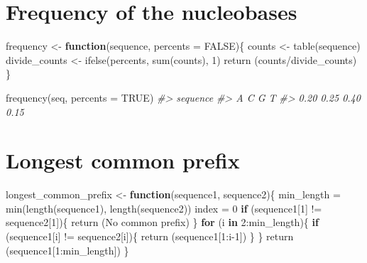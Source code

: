 \documentclass[
]{book}
\newenvironment{Shaded}{\begin{snugshade}}{\end{snugshade}}
\newcommand{\AttributeTok}[1]{\textcolor[rgb]{0.77,0.63,0.00}{#1}}
\newcommand{\CommentTok}[1]{\textcolor[rgb]{0.56,0.35,0.01}{\textit{#1}}}
\newcommand{\ConstantTok}[1]{\textcolor[rgb]{0.00,0.00,0.00}{#1}}
\newcommand{\ControlFlowTok}[1]{\textcolor[rgb]{0.13,0.29,0.53}{\textbf{#1}}}
\newcommand{\DecValTok}[1]{\textcolor[rgb]{0.00,0.00,0.81}{#1}}
\newcommand{\FunctionTok}[1]{\textcolor[rgb]{0.00,0.00,0.00}{#1}}
\newcommand{\NormalTok}[1]{#1}
\newcommand{\OtherTok}[1]{\textcolor[rgb]{0.56,0.35,0.01}{#1}}
\newcommand{\SpecialCharTok}[1]{\textcolor[rgb]{0.00,0.00,0.00}{#1}}
\newcommand{\StringTok}[1]{\textcolor[rgb]{0.31,0.60,0.02}{#1}}
\begin{document}
\hypertarget{frequency-of-the-nucleobases}{%
\section{Frequency of the nucleobases}\label{frequency-of-the-nucleobases}}

\begin{Shaded}
\begin{Highlighting}[]
\NormalTok{frequency }\OtherTok{\textless{}{-}} \ControlFlowTok{function}\NormalTok{(sequence, }\AttributeTok{percents =} \ConstantTok{FALSE}\NormalTok{)\{}
\NormalTok{  counts }\OtherTok{\textless{}{-}} \FunctionTok{table}\NormalTok{(sequence)}
\NormalTok{  divide\_counts }\OtherTok{\textless{}{-}} \FunctionTok{ifelse}\NormalTok{(percents, }\FunctionTok{sum}\NormalTok{(counts), }\DecValTok{1}\NormalTok{)}
  \FunctionTok{return}\NormalTok{ (counts}\SpecialCharTok{/}\NormalTok{divide\_counts)}
\NormalTok{\}}
\end{Highlighting}
\end{Shaded}

\begin{Shaded}
\begin{Highlighting}[]
\FunctionTok{frequency}\NormalTok{(seq, }\AttributeTok{percents =} \ConstantTok{TRUE}\NormalTok{)}
\CommentTok{\#\textgreater{} sequence}
\CommentTok{\#\textgreater{}    A    C    G    T }
\CommentTok{\#\textgreater{} 0.20 0.25 0.40 0.15}
\end{Highlighting}
\end{Shaded}

\hypertarget{longest-common-prefix}{%
\section{Longest common prefix}\label{longest-common-prefix}}

\begin{Shaded}
\begin{Highlighting}[]
\NormalTok{longest\_common\_prefix }\OtherTok{\textless{}{-}} \ControlFlowTok{function}\NormalTok{(sequence1, sequence2)\{}
\NormalTok{  min\_length }\OtherTok{=} \FunctionTok{min}\NormalTok{(}\FunctionTok{length}\NormalTok{(sequence1), }\FunctionTok{length}\NormalTok{(sequence2))}
\NormalTok{  index }\OtherTok{=} \DecValTok{0}
  \ControlFlowTok{if}\NormalTok{ (sequence1[}\DecValTok{1}\NormalTok{] }\SpecialCharTok{!=}\NormalTok{ sequence2[}\DecValTok{1}\NormalTok{])\{}
    \FunctionTok{return}\NormalTok{ (}\StringTok{\textquotesingle{}No common prefix\textquotesingle{}}\NormalTok{)}
\NormalTok{  \}}
  \ControlFlowTok{for}\NormalTok{ (i }\ControlFlowTok{in} \DecValTok{2}\SpecialCharTok{:}\NormalTok{min\_length)\{}
    \ControlFlowTok{if}\NormalTok{ (sequence1[i] }\SpecialCharTok{!=}\NormalTok{ sequence2[i])\{}
      \FunctionTok{return}\NormalTok{ (sequence1[}\DecValTok{1}\SpecialCharTok{:}\NormalTok{i}\DecValTok{{-}1}\NormalTok{])}
\NormalTok{    \}}
\NormalTok{  \}}
  \FunctionTok{return}\NormalTok{ (sequence1[}\DecValTok{1}\SpecialCharTok{:}\NormalTok{min\_length])}
\NormalTok{\}}
\end{Highlighting}
\end{Shaded}
\end{document}
